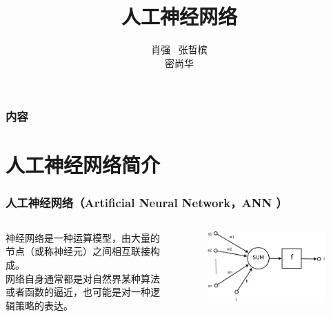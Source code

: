 \documentclass[table]{beamer}
\title{人工神经网络}
\author{肖强 \ 张哲槟\\密尚华}
\institute{}
\begin{document}
  
  
\begin{frame}
\titlepage
\end{frame}

\begin{frame}
	\frametitle{内容}
	
	\begin{multicols}{2}
		\tableofcontents
	\end{multicols}
\end{frame}

\section{人工神经网络简介}

\begin{frame} 
\frametitle{人工神经网络（Artificial Neural Network，ANN ）}  
\begin{columns}

神经网络是一种运算模型，由大量的节点（或称神经元）之间相互联接构成。
\\ 网络自身通常都是对自然界某种算法或者函数的逼近，也可能是对一种逻辑策略的表达。

	\begin{figure}[ht]
	\centering
	\includegraphics[width=\linewidth]{partition/img/Ncell.png}  
	\end{figure}


\end{columns}


\end{frame}  


\end{document}
